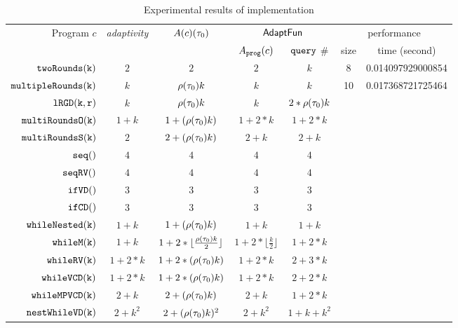 \begin {table}[H]
    \caption{Experimental results of {\THESYSTEM} implementation}
        \label{tb:adapt-imp}
        \begin{center}
        \centering
{\footnotesize
        \begin{tabular}{ r | c | c | c | c | c | c }
        \multirow{2}{*}{Program $c$} & 
        \multirow{2}{*}{\emph{adaptivity}} 
         & \multirow{2}{*}{$A(c) (\mathtt{\tau}_0)$} 
         & \multicolumn{2}{c|}{$\textsf{AdaptFun}$}
         & \multicolumn{2}{c}{performance} \\ 
         \cline{4-7}
         & & & $A_{\mathtt{prog}}(c)$ & ${\tt query}$ \# & size & time (second) \\
         \hline \hline
         $  \mathtt{twoRounds(k)}$ & $2$ & $2$ & $2$ & $k$ & 8 & 0.014097929000854 \\
         $  \mathtt{multipleRounds(k)}$ & $k$ & $ \rho(\mathtt{\tau}_0) k $ & $k$ & $k$  &  10 & 0.017368721725464  \\
         $  \mathtt{lRGD(k, r)}$ & $k$ & $\rho(\mathtt{\tau}_0) k$ & $k$ & $2 * \rho(\mathtt{\tau}_0) k$  &    \\
         $  \mathtt{multiRoundsO(k)}$ & $1 + k$ & $1 + (\rho(\mathtt{\tau}_0) k) $  & $1 +2 * k$ & $1 + 2*k$  &    \\
         $  \mathtt{multiRoundsS(k)}$    & $2$ & $2 + (\rho(\mathtt{\tau}_0) k) $ & $2 + k$ & $2 + k$  &    \\
         $  \mathtt{seq()}$ & $4$ & $4$ & $4$ & $4$ & \\ 
         $  \mathtt{seqRV()}$ & $4$ & $4$ & $4$ & $4$ & \\  
         $  \mathtt{ifVD()}$ & $3$ & $3$ & $3$ & $3$ & \\
         $  \mathtt{ifCD()}$ & $3$ & $3$ & $3$ & $3$  &    \\
         $  \mathtt{whileNested(k)}$ & $1+k$ & $1+ (\rho(\mathtt{\tau}_0) k)$ & $1+k$  &  $1+k$ &  \\
         $  \mathtt{whileM(k)}$ & $1 + k$ & $1 +2 * \lfloor \frac{\rho(\mathtt{\tau}_0) k}{2} \rfloor$ & $1 +2 * \lfloor \frac{k}{2} \rfloor$ & $1 + 2 * k$  &    \\
         $  \mathtt{whileRV(k)}$ & $1 + 2*k$ & $1 + 2*(\rho(\mathtt{\tau}_0) k)$ & $1 + 2*k$ & $2 + 3 * k$  &    \\
         $  \mathtt{whileVCD(k)}$ & $1 + 2*k$ & $1 + 2*(\rho(\mathtt{\tau}_0) k)$ & $1 + 2 * k$ & $2 + 2 * k$  &    \\
         $  \mathtt{whileMPVCD(k)}$ & $2 + k$ & $2 + (\rho(\mathtt{\tau}_0) k)$  & $2 + k$ & $1 + 2 * k$   &    \\
         $  \mathtt{nestWhileVD(k)}$ & $2 + k^2$ & $2 + (\rho(\mathtt{\tau}_0) k)^2$  & $2 + k^2$ & $1 + k + k^2$   &    \\

\end{tabular}}
\end{center}
\end{table}
